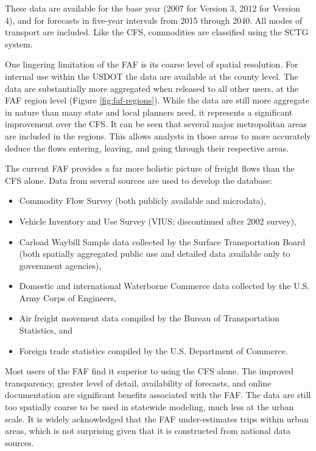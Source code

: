\noindent These data are available for the base year (2007 for Version 3, 2012 for Version 4), and for forecasts in five-year intervals from 2015 through 2040. All modes of transport are included. Like the CFS, commodities are classified using the SCTG system. 

One lingering limitation of the FAF is its coarse level of spatial resolution. For internal use within the USDOT the data are available at the county level. The data are substantially more aggregated when released to all other users, at the FAF region level (Figure \ref{fig:faf-regions}). While the data are still more aggregate in nature than many state and local planners need, it represents a significant improvement over the CFS. It can be seen that several major metropolitan areas are included in the regions. This allows analysts in those areas to more accurately deduce the flows entering, leaving, and going through their respective areas.

The current FAF provides a far more holistic picture of freight flows than the CFS alone. Data from several sources are used to develop the database:
\begin{itemize}
\item Commodity Flow Survey (both publicly available and microdata),
\item Vehicle Inventory and Use Survey (VIUS; discontinued after 2002 survey),
\item Carload Waybill Sample data collected by the Surface Transportation Board (both spatially aggregated public use and detailed data available only to government agencies),
\item Domestic and international Waterborne Commerce data collected by the U.S. Army Corps of Engineers,
\item Air freight movement data compiled by the Bureau of Transportation Statistics, and
\item Foreign trade statistics compiled by the U.S. Department of Commerce.
\end{itemize}

Most users of the FAF find it superior to using the CFS alone. The improved transparency, greater level of detail, availability of forecasts, and online documentation are significant benefits associated with the FAF. The data are still too spatially coarse to be used in statewide modeling, much less at the urban scale. It is widely acknowledged that the FAF under-estimates trips within urban areas, which is not surprising given that it is constructed from national data sources.

